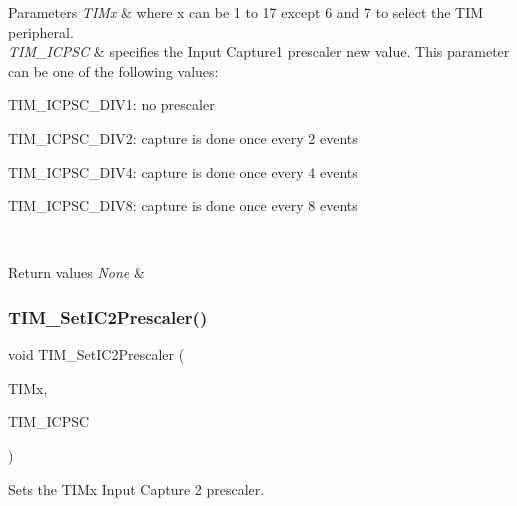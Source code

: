 \begin{DoxyParams}{Parameters}
{\em T\+I\+Mx} & where x can be 1 to 17 except 6 and 7 to select the T\+IM peripheral. \\
\hline
{\em T\+I\+M\+\_\+\+I\+C\+P\+SC} & specifies the Input Capture1 prescaler new value. This parameter can be one of the following values\+: \begin{DoxyItemize}
\item T\+I\+M\+\_\+\+I\+C\+P\+S\+C\+\_\+\+D\+I\+V1\+: no prescaler \item T\+I\+M\+\_\+\+I\+C\+P\+S\+C\+\_\+\+D\+I\+V2\+: capture is done once every 2 events \item T\+I\+M\+\_\+\+I\+C\+P\+S\+C\+\_\+\+D\+I\+V4\+: capture is done once every 4 events \item T\+I\+M\+\_\+\+I\+C\+P\+S\+C\+\_\+\+D\+I\+V8\+: capture is done once every 8 events \end{DoxyItemize}
\\
\hline
\end{DoxyParams}

\begin{DoxyRetVals}{Return values}
{\em None} & \\
\hline
\end{DoxyRetVals}
\mbox{\label{group___t_i_m___exported___functions_ga3cc4869b5fe73271808512c89322a325}} 
\subsubsection{\texorpdfstring{TIM\_SetIC2Prescaler()}{TIM\_SetIC2Prescaler()}}
{\footnotesize\ttfamily void T\+I\+M\+\_\+\+Set\+I\+C2\+Prescaler (\begin{DoxyParamCaption}\item[{\mbox{\hyperlink{struct_t_i_m___type_def}{T\+I\+M\+\_\+\+Type\+Def}} $\ast$}]{T\+I\+Mx,  }\item[{uint16\+\_\+t}]{T\+I\+M\+\_\+\+I\+C\+P\+SC }\end{DoxyParamCaption})}



Sets the T\+I\+Mx Input Capture 2 prescaler. 


